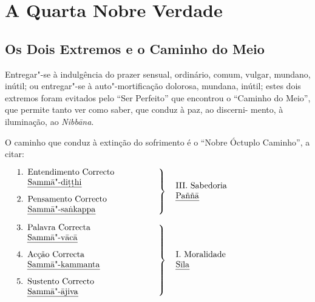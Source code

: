 
\chapter{A Quarta Nobre Verdade}


\section{Os Dois Extremos e o Caminho do Meio}

Entregar"-se à indulgência do prazer sensual, ordinário, comum, vulgar, mundano,
inútil; ou entregar"-se à auto"-mortificação dolorosa, mundana, inútil; estes dois
extremos foram evitados pelo “Ser Perfeito” que encontrou o “Caminho do
Meio”, que permite tanto ver como saber, que conduz à paz, ao discerni- mento,
à iluminação, ao \emph{Nibbāna}.

O caminho que conduz à extinção do sofrimento é o “Nobre Óctuplo Caminho”, a
citar:

\clearpage

$\left.
\begin{minipage}{0.52\linewidth}
\raggedright
\begin{enumerate}
  \item Entendimento Correcto\newline
        \emph{Sammā"-diṭṭhi}

  \item Pensamento Correcto\newline
        \emph{Sammā"-saṅkappa}
\end{enumerate}
\end{minipage}
\right\}
\hspace*{10pt}\parbox{0.4\linewidth}{III. Sabedoria\\ \emph{Paññā}}
$

\bigskip

$\left.
\begin{minipage}{0.52\linewidth}
\raggedright
\begin{enumerate}
\setcounter{enumi}{2}
  \item Palavra Correcta\newline
        \emph{Sammā"-vācā}

  \item Acção Correcta\newline
        \emph{Sammā"-kammanta}

  \item Sustento Correcto\newline
        \emph{Sammā"-ājiva}
\end{enumerate}
\end{minipage}
\right\}
\hspace*{10pt}\parbox{0.4\linewidth}{I. Moralidade\\ \emph{Sīla}}
$

